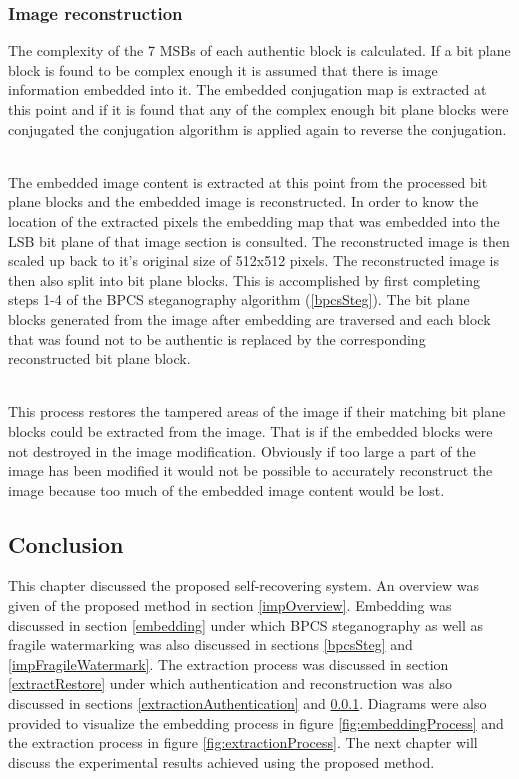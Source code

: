 \documentclass[12pt]{article}
\begin{document}
\subsubsection{Image reconstruction}
\label{extractionReconstruction}
The complexity of the 7 MSBs of each authentic block is calculated.
If a bit plane block is found to be complex enough it is assumed that there is image information embedded into it.
The embedded conjugation map is extracted at this point and if it is found that any of the complex enough bit plane blocks were conjugated the conjugation algorithm is applied again to reverse the conjugation.

\hspace{0pt} \\
The embedded image content is extracted at this point from the processed bit plane blocks and the embedded image is reconstructed.
In order to know the location of the extracted pixels the embedding map that was embedded into the LSB bit plane of that image section is consulted.
The reconstructed image is then scaled up back to it's original size of 512x512 pixels.
The reconstructed image is then also split into bit plane blocks.
This is accomplished by first completing steps 1-4 of the BPCS steganography algorithm (\ref{bpcsSteg}).
The bit plane blocks generated from the image after embedding are traversed and each block that was found not to be authentic is replaced by the corresponding reconstructed bit plane block. 

\hspace{0pt} \\
This process restores the tampered areas of the image if their matching bit plane blocks could be extracted from the image. That is if the embedded blocks were not destroyed in the image modification. 
Obviously if too large a part of the image has been modified it would not be possible to accurately reconstruct the image because too much of the embedded image content would be lost.

\subsection{Conclusion}
This chapter discussed the proposed self-recovering system. An overview was given of the proposed method in section \ref{impOverview}. 
Embedding was discussed in section \ref{embedding} under which BPCS steganography as well as fragile watermarking was also discussed in sections \ref{bpcsSteg} and \ref{impFragileWatermark}.
The extraction process was discussed in section \ref{extractRestore} under which authentication and reconstruction was also discussed in sections \ref{extractionAuthentication} and \ref{extractionReconstruction}. 
Diagrams were also provided to visualize the embedding process in figure \ref{fig:embeddingProcess} and the extraction process in figure \ref{fig:extractionProcess}.
The next chapter will discuss the experimental results achieved using the proposed method.
\end{document}
